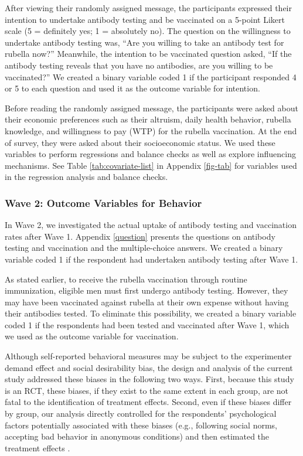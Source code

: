 \documentclass[
]{article}
\begin{document}
After viewing their randomly assigned message, the participants expressed their intention to undertake antibody testing and be vaccinated on a 5-point Likert scale (5 = definitely yes; 1 = absolutely no). The question on the willingness to undertake antibody testing was, ``Are you willing to take an antibody test for rubella now?'' Meanwhile, the intention to be vaccinated question asked, ``If the antibody testing reveals that you have no antibodies, are you willing to be vaccinated?'' We created a binary variable coded 1 if the participant responded 4 or 5 to each question and used it as the outcome variable for intention.

Before reading the randomly assigned message, the participants were asked about their economic preferences such as their altruism, daily health behavior, rubella knowledge, and willingness to pay (WTP) for the rubella vaccination. At the end of survey, they were asked about their socioeconomic status. We used these variables to perform regressions and balance checks as well as explore influencing mechanisms. See Table \ref{tab:covariate-list} in Appendix \ref{fig-tab} for variables used in the regression analysis and balance checks.

\hypertarget{wave2}{%
\subsubsection{Wave 2: Outcome Variables for Behavior}\label{wave2}}

In Wave 2, we investigated the actual uptake of antibody testing and vaccination rates after Wave 1. Appendix \ref{question} presents the questions on antibody testing and vaccination and the multiple-choice answers. We created a binary variable coded 1 if the respondent had undertaken antibody testing after Wave 1.

As stated earlier, to receive the rubella vaccination through routine immunization, eligible men must first undergo antibody testing. However, they may have been vaccinated against rubella at their own expense without having their antibodies tested. To eliminate this possibility, we created a binary variable coded 1 if the respondents had been tested and vaccinated after Wave 1, which we used as the outcome variable for vaccination.

Although self-reported behavioral measures may be subject to the experimenter demand effect and social desirability bias, the design and analysis of the current study addressed these biases in the following two ways. First, because this study is an RCT, these biases, if they exist to the same extent in each group, are not fatal to the identification of treatment effects. Second, even if these biases differ by group, our analysis directly controlled for the respondents' psychological factors potentially associated with these biases (e.g., following social norms, accepting bad behavior in anonymous conditions) and then estimated the treatment effects .
\end{document}
